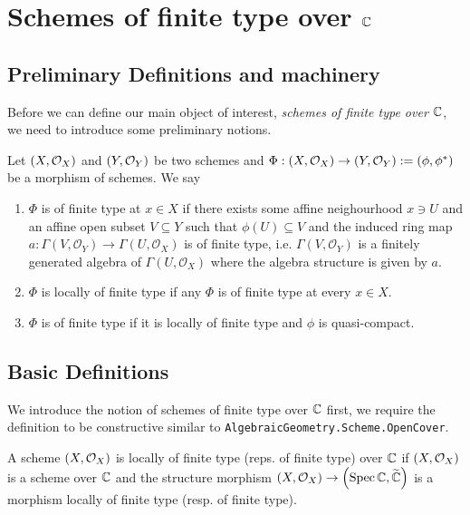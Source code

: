 \chapter{Schemes of finite type over $\mathbb{C}$}

\section{Preliminary Definitions and machinery}

Before we can define our main object of interest, {\em schemes of finite type over $\mathbb{C}$}, we need to introduce some preliminary notions.

\begin{definition}
Let $\left(X, \mathcal{O}_{X}\right)$ and $\left(Y, \mathcal{O}_{Y}\right)$ be two schemes and $\Phi : \left(X, \mathcal{O}_{X}\right) \to \left(Y, \mathcal{O}_{Y}\right) := (\phi, \phi^*)$ be a morphism of schemes. We say 
\begin{enumerate}
    \item $\Phi$ is of finite type at $x \in X$ if there exists some affine neighourhood $x \ni U$ and an affine open subset $V \subseteq Y$ such that $\phi(U) \subseteq V$ and the induced ring map $a: \Gamma(V, \mathcal{O}_Y) \to \Gamma(U, \mathcal{O}_X)$ is of finite type, i.e. $\Gamma(V, \mathcal{O}_Y)$ is a finitely generated algebra of $\Gamma(U, \mathcal{O}_X)$ where the algebra structure is given by $a$.
    \item $\Phi$ is locally of finite type if any $\Phi$ is of finite type at every $x \in X$.
    \item $\Phi$ is of finite type if it is locally of finite type and $\phi$ is quasi-compact.
\end{enumerate}
\end{definition}

\section{Basic Definitions}

We introduce the notion of schemes of finite type over $\mathbb{C}$ first, we require the definition to be constructive similar
to {\tt AlgebraicGeometry.Scheme.OpenCover}.
\begin{definition}\label{def:SchemeLocallyOfFiniteType}
    A scheme $\left(X, \mathcal{O}_{X}\right)$ is locally of finite type (reps. of finite type) over $\mathbb{C}$ if $\left(X, \mathcal{O}_{X}\right)$ is a scheme over $\mathbb{C}$ and the structure morphism $\left(X, \mathcal{O}_{X}\right) \to \left(\operatorname*{Spec}{\mathbb{C}}, \widetilde{\mathbb{C}}\right)$ is a morphism locally of finite type (resp. of finite type). 
\end{definition}

